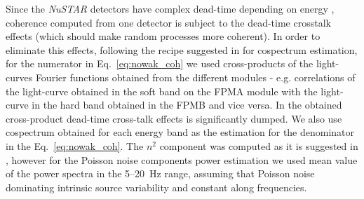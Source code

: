 \documentclass[a4paper,fleqn,usenatbib]{mnras}
\def\grs{{GRS\,1739-278\,}}
\begin{document}


Since the {\it NuSTAR} detectors have complex dead-time depending on energy \citep[see ][for a details on how this affects power spectra]{2015ApJ...800..109B}, coherence computed from one detector is subject to the dead-time crosstalk effects (which should make random processes more coherent).
In order to eliminate this effects, following the recipe suggested in \cite{2015ApJ...800..109B} for cospectrum estimation, for the numerator in Eq.~\ref{eq:nowak_coh} we used cross-products of the light-curves Fourier functions obtained from the different modules - e.g. correlations of the light-curve obtained in the soft band on the FPMA module with the light-curve in the hard band obtained in the FPMB and vice versa.
In the obtained cross-product dead-time cross-talk effects is significantly dumped.
We also use cospectrum obtained for each energy band as the estimation for the denominator in the Eq.~\ref{eq:nowak_coh}.
The $n^2$ component was computed as it is suggested in \citep{1997ApJ...474L..43V}, however for the Poisson noise components power estimation we used mean value of the power spectra in the 5--20~Hz range, assuming that Poisson noise dominating intrinsic source variability and constant along frequencies. 
\end{document}
